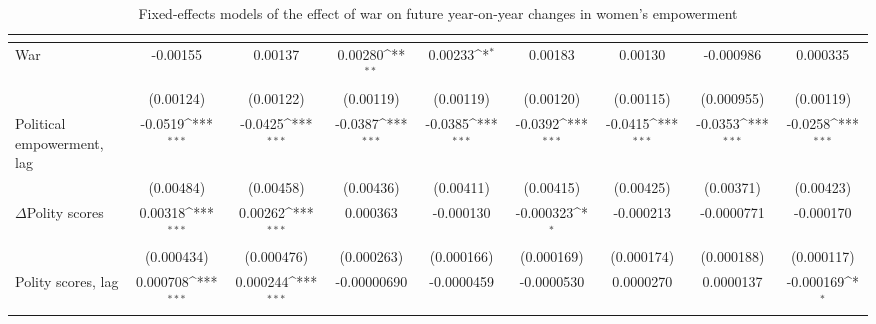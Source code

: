 \begin{table}[htbp]\centering
\def\sym#1{\ifmmode^{#1}\else\(^{#1}\)\fi}
\caption{Fixed-effects models of the effect of war on future year-on-year changes in women's empowerment\label{fyearonyearpolempower}}
\begin{tabular}{l*{8}{c}}
\hline\hline
                    &&&&&&&&\\
\hline
War          &    -0.00155         &     0.00137         &     0.00280\sym{**} &     0.00233\sym{*}  &     0.00183         &     0.00130         &   -0.000986         &    0.000335         \\
                    &   (0.00124)         &   (0.00122)         &   (0.00119)         &   (0.00119)         &   (0.00120)         &   (0.00115)         &  (0.000955)         &   (0.00119)         \\
[1em]
Political empowerment, lag   &     -0.0519\sym{***}&     -0.0425\sym{***}&     -0.0387\sym{***}&     -0.0385\sym{***}&     -0.0392\sym{***}&     -0.0415\sym{***}&     -0.0353\sym{***}&     -0.0258\sym{***}\\
                    &   (0.00484)         &   (0.00458)         &   (0.00436)         &   (0.00411)         &   (0.00415)         &   (0.00425)         &   (0.00371)         &   (0.00423)         \\
[1em]
$\Delta$Polity scores        &     0.00318\sym{***}&     0.00262\sym{***}&    0.000363         &   -0.000130         &   -0.000323\sym{*}  &   -0.000213         &  -0.0000771         &   -0.000170         \\
                    &  (0.000434)         &  (0.000476)         &  (0.000263)         &  (0.000166)         &  (0.000169)         &  (0.000174)         &  (0.000188)         &  (0.000117)         \\
[1em]
Polity scores, lag           &    0.000708\sym{***}&    0.000244\sym{***}& -0.00000690         &  -0.0000459         &  -0.0000530         &   0.0000270         &   0.0000137         &   -0.000169\sym{*}  \\

\end{tabular}
\end{table}
